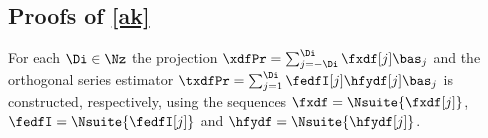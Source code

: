 %                                                                 
% 
%
\subsection{Proofs of \cref{ak}}\label{a:ak}
\begin{te}
For each
  $\Di\in\Nz$ the projection $\xdfPr=\sum_{j=-\Di}^{\Di}\fxdf[j]\bas_j$ and
  the  orthogonal series estimator
  $\txdfPr=\sum_{j=1}^{\Di}\fedfI[j]\hfydf[j]\bas_j$  is constructed, respectively, using
the sequences  $\fxdf=\Nsuite{\fxdf[j]}$, $\fedfI=\Nsuite{\fedfI[j]}$ and  $\hfydf=\Nsuite{\hfydf[j]}$. %
\end{te}
